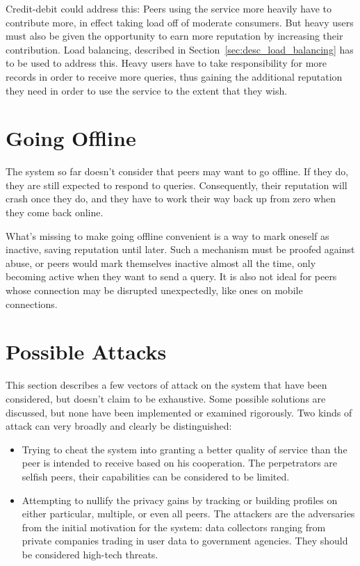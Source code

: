 Credit-debit could address this: Peers using the service more heavily have to
contribute more, in effect taking load off of moderate consumers. But heavy
users must also be given the opportunity to earn more reputation by increasing
their contribution. Load balancing, described in
Section~\ref{sec:desc_load_balancing} has to be used to address this. Heavy
users have to take responsibility for more records in order to receive more
queries, thus gaining the additional reputation they need in order to use the
service to the extent that they wish.

\section{Going Offline}
The system so far doesn't consider that peers may want to go offline. If they
do, they are still expected to respond to queries. Consequently, their
reputation will crash once they do, and they have to work their way back up from
zero when they come back online.

What's missing to make going offline convenient is a way to mark oneself as
inactive, saving reputation until later. Such a mechanism must be proofed
against abuse, or peers would mark themselves inactive almost all the time, only
becoming active when they want to send a query. It is also not ideal for peers
whose connection may be disrupted unexpectedly, like ones on mobile connections.

\section{Possible Attacks}
This section describes a few vectors of attack on the system that have been
considered, but doesn't claim to be exhaustive. Some possible solutions are
discussed, but none have been implemented or examined rigorously. Two kinds of
attack can very broadly and clearly be distinguished:
\begin{itemize}
\item Trying to cheat the system into granting a better quality of service than
the peer is intended to receive based on his cooperation. The perpetrators are
selfish peers, their capabilities can be considered to be limited.
\item Attempting to nullify the privacy gains by tracking or building profiles
on either particular, multiple, or even all peers. The attackers are the
adversaries from the initial motivation for the system: data collectors ranging
from private companies trading in user data to government agencies. They should
be considered high-tech threats.
\end{itemize}

